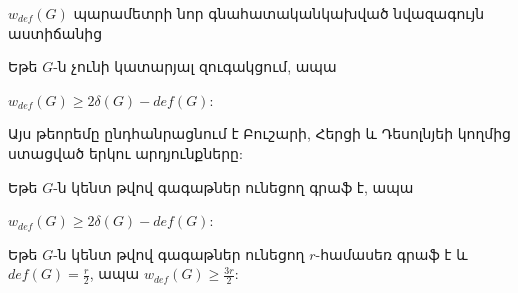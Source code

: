 \begin{frame}{$w_{def}(G)$ պարամետրի նոր գնահատական}{կախված նվազագույն աստիճանից}

\begin{theorem}[3.1.7]
Եթե $G$-ն չունի կատարյալ զուգակցում, ապա
\begin{center}
$w_{def}(G)\geq 2\delta(G)-def(G)$:
\end{center}
\end{theorem}

Այս թեորեմը ընդհանրացնում է Բուշարի, Հերցի և Դեսոլնյեի կողմից ստացված երկու արդյունքները:
\begin{hide}

\begin{corollary}
\label{c3_wdef_odd}\cite{BouchardHertzDesaulniers} Եթե $G$-ն կենտ թվով գագաթներ ունեցող գրաֆ է, ապա
\begin{center}
$w_{def}(G)\geq 2\delta(G)-def(G)$:
\end{center}
\end{corollary}

\begin{corollary}
\label{c3_wdef_odd_regular}\cite{BouchardHertzDesaulniers} Եթե $G$-ն կենտ թվով գագաթներ ունեցող $r$-համասեռ գրաֆ է և $def(G)=\frac{r}{2}$, ապա
$w_{def}(G)\geq \frac{3r}{2}$:
\end{corollary}
\end{hide}
\end{frame}


